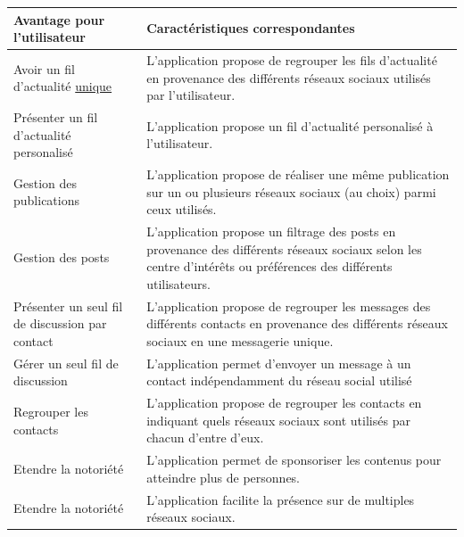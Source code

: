 \documentclass[11pt]{article}
\begin{document}

\begin{center}
	\begin{tabular}{|L{.25\textwidth}|L{.7\textwidth}|}
	\hline
	\textbf{Avantage pour l’utilisateur} & \textbf{Caractéristiques correspondantes} \\
	\hline
	Avoir un fil d'actualité \underline{unique} & L’application propose de regrouper les fils d’actualité en provenance des différents réseaux sociaux utilisés par l’utilisateur. \\
	\hline
	Présenter un fil d’actualité personalisé & L’application propose un fil d’actualité personalisé à l’utilisateur. \\
	\hline
	Gestion des publications & L’application propose de réaliser une même publication sur un ou plusieurs réseaux sociaux (au choix) parmi ceux utilisés. \\
	\hline
	Gestion des posts & L’application propose un filtrage des posts en provenance des différents réseaux sociaux selon les centre d’intérêts ou préférences des différents utilisateurs. \\
	\hline
	Présenter un seul fil de discussion par contact & L’application propose de regrouper les messages des différents contacts en provenance des différents réseaux sociaux en une messagerie unique. \\
	\hline
	Gérer un seul fil de discussion & L’application permet d’envoyer un message à un contact indépendamment du réseau social utilisé \\
	\hline
	Regrouper les contacts & L’application propose de regrouper les contacts en indiquant quels réseaux sociaux sont utilisés par chacun d’entre d’eux. \\
	\hline
	Etendre la notoriété & L’application permet de sponsoriser les contenus pour atteindre plus de personnes. \\
	\hline
	Etendre la notoriété & L’application facilite la présence sur de multiples réseaux sociaux. \\
	\hline
\end{tabular}
\end{center}
\end{document}
